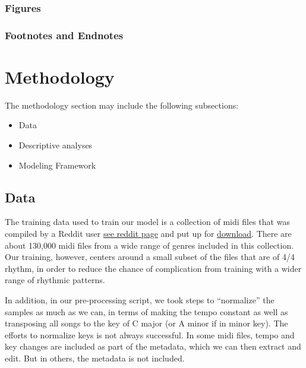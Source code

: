 \documentclass[12pt,oneside]{chicagocapstone}
\providecommand{\tightlist}{%
  \setlength{\itemsep}{0pt}\setlength{\parskip}{0pt}}
\begin{document}
\hypertarget{figures}{%
\subsection*{Figures}\label{figures}}

\hypertarget{footnotes-and-endnotes}{%
\subsection*{Footnotes and Endnotes}\label{footnotes-and-endnotes}}

\hypertarget{methodology}{%
\chapter*{Methodology}\label{methodology}}

The methodology section may include the following subsections:
\begin{itemize}
\tightlist
\item
  Data
\item
  Descriptive analyses
\item
  Modeling Framework
\end{itemize}
\hypertarget{methodology-data}{%
\section*{Data}\label{methodology-data}}

The training data used to train our model is a collection of midi files that was compiled by a Reddit user \href{https://www.reddit.com/r/WeAreTheMusicMakers/comments/3ajwe4/the_largest_midi_collection_on_the_internet/}{see reddit page} and put up for \href{https://mega.co.nz/\#!Elg1TA7T!MXEZPzq9s9YObiUcMCoNQJmCbawZqzAkHzY4Ym6Gs_Q}{download}. There are about 130,000 midi files from a wide range of genres included in this collection. Our training, however, centers around a small subset of the files that are of 4/4 rhythm, in order to reduce the chance of complication from training with a wider range of rhythmic patterns.

In addition, in our pre-processing script, we took steps to ``normalize'' the samples as much as we can, in terms of making the tempo constant as well as transposing all songs to the key of C major (or A minor if in minor key). The efforts to normalize keys is not always successful. In some midi files, tempo and key changes are included as part of the metadata, which we can then extract and edit. But in others, the metadata is not included.
\end{document}
